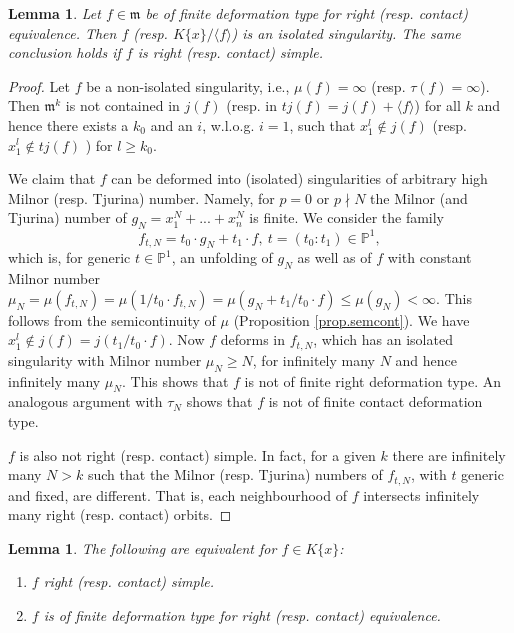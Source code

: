 \documentclass[11pt]{article}
\newtheorem{Lemma}[Definition]{Lemma}
\renewcommand{\P}{{\mathbb P}}
\newcommand{\fm}{\mathfrak{m}}
\begin{document}
\begin{Lemma}\label{lem:simple-is-isolated}
Let $f\in \fm$ be of finite deformation type for right (resp. contact) equivalence. Then $f$ (resp. $K\{x\}/\langle f\rangle$) is an isolated singularity. The same conclusion holds if $f$ is right (resp. contact) simple.
\end{Lemma}
\begin{proof}
Let $f$ be a non-isolated singularity, i.e., $\mu(f) =\infty$ (resp. $\tau(f) = \infty$).  Then 
$\fm^k$ is not contained in $j(f)$ (resp. in $tj(f) =j(f) + \langle f \rangle$) for all $k$ and hence there exists a $k_0$ and an $i$, w.l.o.g. $i=1$, such that $x_1^l \notin j(f)$ (resp. $x_1^l \notin tj(f)$ ) for $l\geq k_0$. 

We claim that $f$ can be
deformed into (isolated) singularities of arbitrary high Milnor (resp. Tjurina) number. Namely, for $p=0$ or $p \nmid N $ the Milnor (and Tjurina) number of  $g_N= x_1^N+... + x_n^N$ is finite. We consider the family
$$f_{t,N} = t_0 \cdot g_N+ t_1\cdot f, \ t=(t_0:t_1) \in \P^1,$$
which is,  for generic $t\in \P^1$, an unfolding of $g_N$ as well as of $f$ with constant Milnor number $\mu_N = \mu(f_{t,N})= \mu(1/t_0 \cdot f_{t,N}) =\mu(g_N + t_1/t_0 \cdot f) \le \mu(g_N) < \infty$. This follows from the semicontinuity of $\mu$ (Proposition \ref{prop.semcont}).  We have $x_1^l  \notin j(f)=j(t_1/t_0 \cdot f)$. 
Now $f$ deforms in $f_{t,N}$, which has an isolated singularity with Milnor number  $\mu_N \ge N $, for infinitely many $N$ and hence infinitely many $\mu_N$. This shows that $f$ is not of finite right deformation type.
An analogous argument with $\tau_N$ shows that $f$ is not of finite contact deformation type.

$f$ is also not right (resp. contact) simple. In fact, for a given $k$ there are infinitely many $N>k$ 
such that the Milnor (resp. Tjurina) numbers of $f_{t,N}$, with $t$ generic and fixed, are different. That is, each neighbourhood of $f$ intersects infinitely many
right (resp. contact) orbits.
\end{proof}

\begin{Lemma}\label{lem:findeftype} The following  are equivalent for $f\in K\{x\}$:
\begin{enumerate}
\item $f$ right  (resp. contact) simple.
\item $f$ is of finite deformation type for right (resp. contact) equivalence. 
\end{enumerate}
\end{Lemma}
\end{document}
